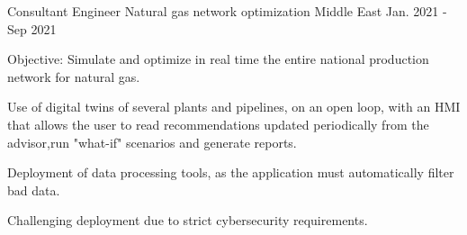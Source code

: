 

\begin{cventries}

  \cventry
    {Consultant Engineer} %
    {Natural gas network optimization} %
    {Middle East} %
    {Jan. 2021 - Sep 2021} %
    {
      \begin{cvitems} %
        \item {Objective: Simulate and optimize in real time the entire national production network for natural gas. }
        \item {Use of digital twins of several plants and pipelines, on an open loop, with an HMI that allows the user to read recommendations updated periodically from the advisor,run "what-if" scenarios and generate reports. }
        \item {Deployment of data processing tools, as the application must automatically filter bad data.}
        \item {Challenging deployment due to strict cybersecurity requirements.}
      \end{cvitems}
    }


\end{cventries}
